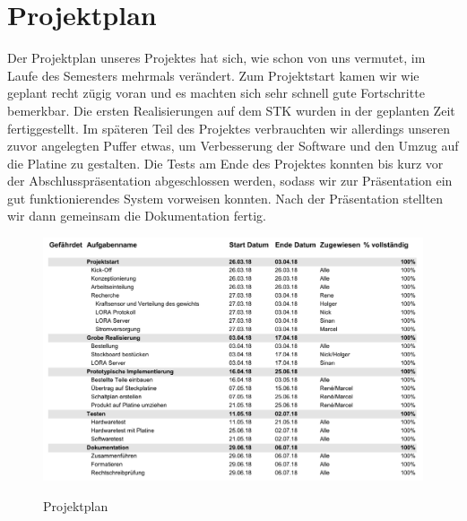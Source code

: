 \chapter{Projektplan}
Der Projektplan unseres Projektes hat sich, wie schon von uns vermutet, im Laufe des Semesters mehrmals verändert. Zum Projektstart kamen wir wie geplant recht zügig voran und es machten sich sehr schnell gute Fortschritte bemerkbar. Die ersten Realisierungen auf dem STK wurden in der geplanten Zeit fertiggestellt. Im späteren Teil des Projektes verbrauchten wir allerdings unseren zuvor angelegten Puffer etwas, um Verbesserung der Software und den Umzug auf die Platine zu gestalten. Die Tests am Ende des Projektes konnten bis kurz vor der Abschlusspräsentation abgeschlossen werden, sodass wir zur Präsentation ein gut funktionierendes System vorweisen konnten. Nach der Präsentation stellten wir dann gemeinsam die Dokumentation fertig. 
\begin{figure}[ht]
    \center
    \includegraphics[width=15cm]{Bilder/projektplan.png}\\
    \caption{Projektplan}
    \label{fig:Projektplan}
\end{figure}

